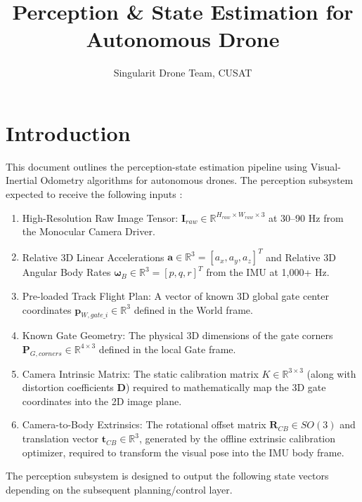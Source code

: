 \documentclass{article}
\title{Perception \& State Estimation for Autonomous Drone}
\author{Singularit Drone Team, CUSAT}
\date{}
\begin{document}
\maketitle
\tableofcontents
\newpage

\section{Introduction}
This document outlines the perception-state estimation pipeline using Visual-Inertial Odometry algorithms for autonomous drones. The perception subsystem expected to receive the following inputs :
\begin{enumerate}
    \item High-Resolution Raw Image Tensor: $\mathbf{I}_{raw} \in \mathbb{R}^{H_{raw} \times W_{raw} \times 3}$ at 30--90 Hz from the Monocular Camera Driver.
    \item Relative 3D Linear Accelerations $\mathbf{a} \in \mathbb{R}^3 = [a_x, a_y, a_z]^T$ and Relative 3D Angular Body Rates $\boldsymbol{\omega}_B \in \mathbb{R}^3 = [p, q, r]^T$ from the IMU at 1,000+ Hz.
    \item Pre-loaded Track Flight Plan: A vector of known 3D global gate center coordinates $\mathbf{p}_{W, gate\_i} \in \mathbb{R}^3$ defined in the World frame.
    \item Known Gate Geometry: The physical 3D dimensions of the gate corners $\mathbf{P}_{G, corners} \in \mathbb{R}^{4 \times 3}$ defined in the local Gate frame.
    \item Camera Intrinsic Matrix: The static calibration matrix $K \in \mathbb{R}^{3 \times 3}$ (along with distortion coefficients $\mathbf{D}$) required to mathematically map the 3D gate coordinates into the 2D image plane.
    \item Camera-to-Body Extrinsics: The rotational offset matrix $\mathbf{R}_{CB} \in SO(3)$ and translation vector $\mathbf{t}_{CB} \in \mathbb{R}^3$, generated by the offline extrinsic calibration optimizer, required to transform the visual pose into the IMU body frame.
\end{enumerate}
The perception subsystem is designed to output the following state vectors depending on the subsequent planning/control layer.
\end{document}
